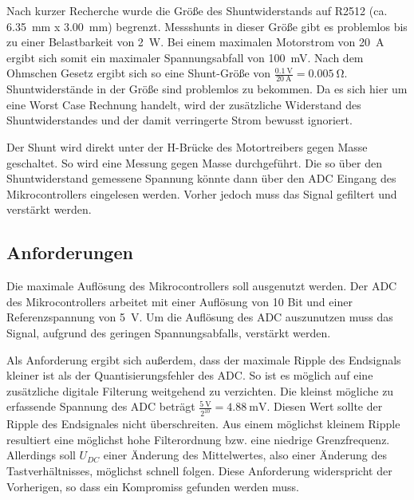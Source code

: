Nach kurzer Recherche wurde die Größe des Shuntwiderstands auf R2512 (ca. \SI{6,35}{\milli\meter} x \SI{3,00}{\milli\meter}) begrenzt. Messshunts in dieser Größe gibt es problemlos bis zu einer Belastbarkeit von \SI{2}{\watt}. 
Bei einem maximalen Motorstrom von \SI{20}{\ampere} ergibt sich somit ein maximaler Spannungsabfall von \SI{100}{\milli\volt}. Nach dem Ohmschen Gesetz ergibt sich so eine Shunt-Größe von
$\frac{\SI{0,1}{\volt}}{\SI{20}{\ampere}}=\SI{0,005}{\ohm}$. Shuntwiderstände in der Größe sind problemlos zu bekommen.
Da es sich hier um eine Worst Case Rechnung handelt, wird der zusätzliche Widerstand des Shuntwiderstandes und der damit verringerte Strom bewusst ignoriert.

Der Shunt wird direkt unter der H-Brücke des Motortreibers gegen Masse geschaltet. So wird eine Messung gegen Masse durchgeführt. Die so über den Shuntwiderstand gemessene Spannung könnte 
dann über den ADC Eingang des Mikrocontrollers eingelesen werden. Vorher jedoch muss das Signal gefiltert und verstärkt werden.

\subsection{Anforderungen}
Die maximale Auflösung des Mikrocontrollers soll ausgenutzt werden. Der ADC des Mikrocontrollers arbeitet mit einer Auflösung von 10 Bit und einer 
Referenzspannung von \SI{5}{\volt}. Um die Auflösung des ADC auszunutzen muss das Signal, aufgrund des geringen Spannungsabfalls, verstärkt werden.

Als Anforderung ergibt sich außerdem, dass der maximale Ripple des Endsignals kleiner ist als der Quantisierungsfehler des ADC.
So ist es möglich auf eine zusätzliche digitale Filterung weitgehend zu verzichten.
Die kleinst mögliche zu erfassende Spannung des ADC beträgt $\frac{\SI{5}{\volt}}{2^{10}}=\SI{4,88}{\milli\volt}$.
Diesen Wert sollte der Ripple des Endsignales nicht überschreiten.
Aus einem möglichst kleinem Ripple resultiert eine möglichst hohe Filterordnung bzw. eine niedrige Grenzfrequenz.
Allerdings soll $U_{DC}$ einer Änderung des Mittelwertes, also einer Änderung des Tastverhältnisses, möglichst
schnell folgen. Diese Anforderung widerspricht der Vorherigen, so dass ein Kompromiss gefunden werden muss.

